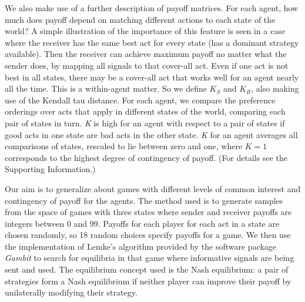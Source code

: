 \documentclass[10pt]{article}
\begin{document}
We also make use of a further description of payoff matrices. For each
agent, how much does payoff depend on matching different actions to each
state of the world? A simple illustration of the importance of this
feature is seen in a case where the receiver has the same best act for
every state (has a dominant strategy available). Then the receiver can
achieve maximum payoff no matter what the sender does, by mapping all
signals to that cover-all act. Even if one act is not best in all
states, there may be a cover-all act that works well for an agent nearly
all the time. This is a within-agent matter. So we define $K_S$ and
$K_R$, also making use of the Kendall tau distance. For each agent, we
compare the preference orderings over acts that apply in different
states of the world, comparing each pair of states in turn. \emph{K} is
high for an agent with respect to a pair of states if good acts in one
state are bad acts in the other state. \emph{K} for an agent averages
all comparisons of states, rescaled to lie between zero and one, where
$K=1$ corresponds to the highest degree of contingency of payoff. (For
details see the Supporting Information.)

Our aim is to generalize about games with different levels of common
interest and contingency of payoff for the agents. The method used is to
generate samples from the space of games with three states where sender
and receiver payoffs are integers between 0 and 99. Payoffs for each
player for each act in a state are chosen randomly, so 18 random choices
specify payoffs for a game. We then use the implementation of Lemke's
\cite{Lemke1965} algorithm provided by the software package \emph{Gambit} \cite{McKelvey2010} to
search for equilibria in that game where informative signals are being
sent and used. The equilibrium concept used is the Nash equilibrium: a
pair of strategies form a Nash equilibrium if neither player can improve
their payoff by unilaterally modifying their strategy.
\end{document}
